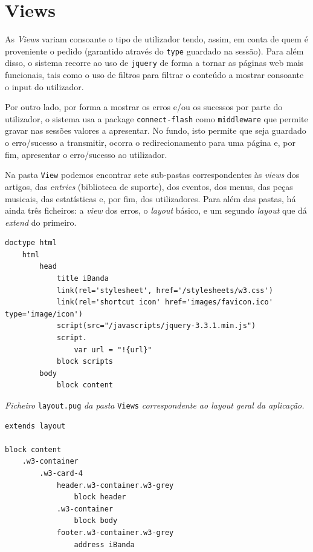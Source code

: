 \section{Views}\label{c:views}

As \textit{Views} variam consoante o tipo de utilizador tendo, assim, em conta de quem é proveniente o pedido (garantido através do \texttt{type} guardado na sessão). Para além disso, o sistema recorre ao uso de \texttt{jquery} de forma a tornar as páginas web mais funcionais, tais como o uso de filtros para filtrar o conteúdo a mostrar consoante o input do utilizador.

Por outro lado, por forma a mostrar os erros e/ou os sucessos por parte do utilizador, o sistema usa a package \texttt{connect-flash} como \texttt{middleware} que permite gravar nas sessões valores a apresentar. No fundo, isto permite que seja guardado o erro/sucesso a transmitir, ocorra o redirecionamento para uma página e, por fim, apresentar o erro/sucesso ao utilizador.

Na pasta \texttt{View} podemos encontrar sete sub-pastas correspondentes às \textit{views} dos artigos, das \textit{entries} (biblioteca de suporte), dos eventos, dos menus, das peças musicais, das estatísticas e, por fim, dos utilizadores. Para além das pastas, há ainda três ficheiros: a \textit{view} dos erros, o \textit{layout} básico, e um segundo \textit{layout} que dá \textit{extend} do primeiro.

\begin{framed}
\begin{lstlisting}[language=pug]
    doctype html
    html
        head
            title iBanda
            link(rel='stylesheet', href='/stylesheets/w3.css')
            link(rel='shortcut icon' href='images/favicon.ico' type='image/icon')
            script(src="/javascripts/jquery-3.3.1.min.js")
            script.
                var url = "!{url}"
            block scripts
        body
            block content
\end{lstlisting}
\end{framed}

\begin{center}
\textit{Ficheiro} \texttt{layout.pug} \textit{da pasta} \texttt{Views} \textit{correspondente ao layout geral da aplicação.}
\end{center}

\begin{framed}
\begin{lstlisting}[language=pug]
extends layout

block content
    .w3-container
        .w3-card-4
            header.w3-container.w3-grey
                block header
            .w3-container
                block body
            footer.w3-container.w3-grey
                address iBanda
\end{lstlisting}
\end{framed}

